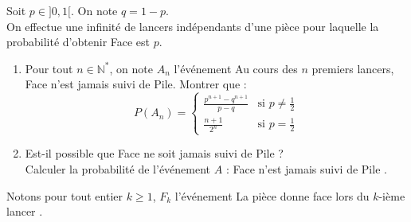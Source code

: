 \documentclass[a4paper,10pt]{report}
\begin{document}
\begin{Exercice}{}
Soit $p \in ]0,1[$. On note $q=1-p$.\\
On effectue une infinité de lancers indépendants d'une pièce pour laquelle la probabilité d'obtenir Face est $p$.
\begin{enumerate}
\item Pour tout $n \in \mathbb{N}^*$, on note $A_n$ l'événement \og Au cours des $n$ premiers lancers, Face n'est jamais suivi de Pile\fg.
Montrer que :
$$P(A_n)=\begin{cases}
{\frac{p^{n+1}-q^{n+1}}{p-q}} & \text{si } p \neq \frac 1 2\\
{\frac{n+1}{2^n}} & \text{si } p=\frac 1 2
\end{cases}$$
\item Est-il possible que Face ne soit jamais suivi de Pile ?\\
Calculer la probabilité de l'événement $A$ : \og Face n'est jamais suivi de Pile \fg.
\end{enumerate}
\end{Exercice}

\corr Notons pour tout entier $k \geq 1$, $F_k$ l'événement \og La pièce donne face lors du $k$-ième lancer \fg .
\end{document}
